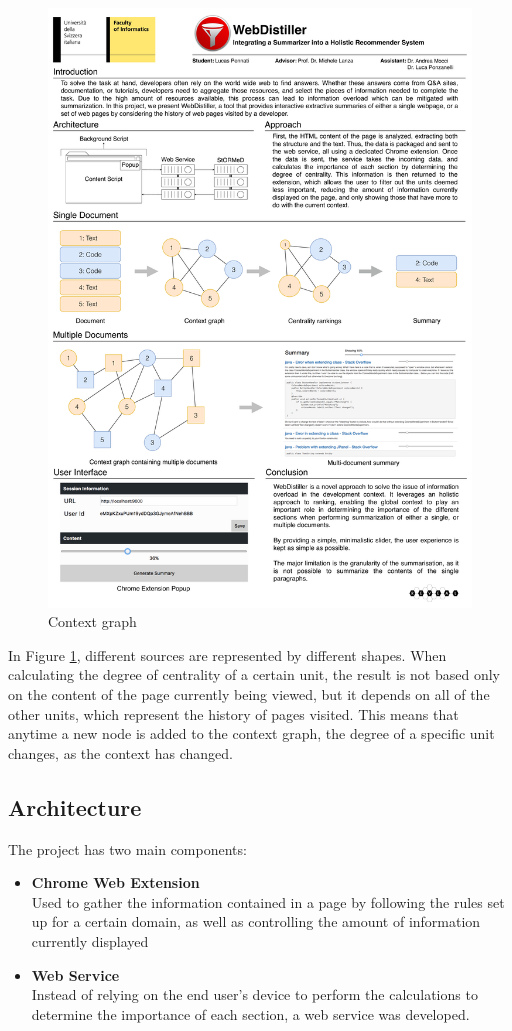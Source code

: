 \begin{figure}[H]
\centering
\includegraphics[scale=0.2]{Figures/mdGraphs}
\caption{Context graph}
\label{fig:multipleDocumentGraph}
\end{figure} 

In Figure \ref{fig:multipleDocumentGraph}, different sources are represented by different shapes. When calculating the degree of centrality of a certain unit, the result is not based only on the content of the page currently being viewed, but it depends on all of the other units, which represent the history of pages visited. This means that anytime a new node is added to the context graph, the degree of a specific unit changes, as the context has changed.

\subsection{Architecture}\label{sec:architecture}
The project has two main components:
\begin{itemize}
\item \textbf{Chrome Web Extension}\\
Used to gather the information contained in a page by following the rules set up for a certain domain, as well as controlling the amount of information currently displayed
\item \textbf{Web Service}\\
Instead of relying on the end user's device to perform the calculations to determine the importance of each section, a web service was developed.
\end{itemize}

